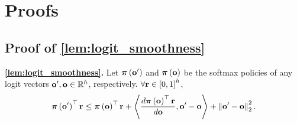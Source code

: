 \section{Proofs}

\subsection{Proof of \cref{lem:logit_smoothness}}

{\bf \cref{lem:logit_smoothness}.} Let ${\boldsymbol{\pi}}\left( {\mathbf{o}}^\prime \right)$ and ${\boldsymbol{\pi}}\left( {\mathbf{o}} \right)$ be the softmax policies of any logit vectors ${\mathbf{o}}^\prime, {\mathbf{o}} \in {\mathbb{R}}^h$, respectively. $\forall {\mathbf{r}} \in \left[ 0, 1\right]^h$,
\begin{equation*}
    {\boldsymbol{\pi}}\left( {\mathbf{o}}^\prime \right)^\top {\mathbf{r}} \le {\boldsymbol{\pi}}\left( {\mathbf{o}} \right)^\top {\mathbf{r}} + \left\langle \frac{d {\boldsymbol{\pi}}\left( {\mathbf{o}} \right)^\top {\mathbf{r}}}{d {\mathbf{o}}}, {\mathbf{o}}^\prime - {\mathbf{o}} \right\rangle + \left\| {\mathbf{o}}^\prime - {\mathbf{o}} \right\|_2^2.
\end{equation*}
